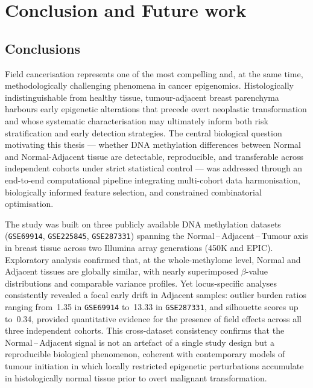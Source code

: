 \chapter{Conclusion and Future work}
\label{chap:conclusion_future_work}

\section{Conclusions}
\label{sec:conclusions}

Field cancerisation represents one of the most compelling and, at the same
time, methodologically challenging phenomena in cancer epigenomics.
Histologically indistinguishable from healthy tissue, tumour-adjacent breast
parenchyma harbours early epigenetic alterations that precede overt
neoplastic transformation and whose systematic characterisation may
ultimately inform both risk stratification and early detection strategies.
The central biological question motivating this thesis --- whether DNA
methylation differences between Normal and Normal-Adjacent tissue are
detectable, reproducible, and transferable across independent cohorts under
strict statistical control --- was addressed through an end-to-end
computational pipeline integrating multi-cohort data harmonisation,
biologically informed feature selection, and constrained combinatorial
optimisation.

The study was built on three publicly available DNA methylation datasets
(\texttt{GSE69914}, \texttt{GSE225845}, \texttt{GSE287331}) spanning the
Normal\,--\,Adjacent\,--\,Tumour axis in breast tissue across two Illumina
array generations (450K and EPIC).
Exploratory analysis confirmed that, at the whole-methylome level, Normal
and Adjacent tissues are globally similar, with nearly superimposed
$\beta$-value distributions and comparable variance profiles.
Yet locus-specific analyses consistently revealed a focal early drift in
Adjacent samples: outlier burden ratios ranging from~1.35 in
\texttt{GSE69914} to~13.33 in \texttt{GSE287331}, and silhouette scores up
to~0.34, provided quantitative evidence for the presence of field effects
across all three independent cohorts.
This cross-dataset consistency confirms that the Normal\,--\,Adjacent signal
is not an artefact of a single study design but a reproducible biological
phenomenon, coherent with contemporary models of tumour initiation in which
locally restricted epigenetic perturbations accumulate in histologically
normal tissue prior to overt malignant transformation.

